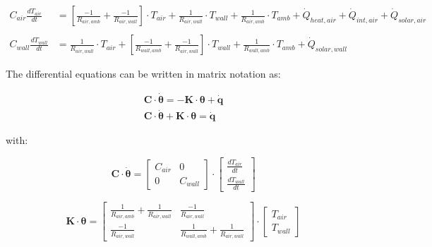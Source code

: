 \begin{equation}
	\begin{aligned}
		C_{air}\frac{dT_{air}}{dt} &= \left[ \frac{-1}{R_{air, amb}} + \frac{-1}{R_{air, wall}} \right]  \cdot T_{air}  + \frac{1}{R_{air, wall}} \cdot T_{wall} + \frac{1}{R_{air, amb}} \cdot T_{amb} + \dot{Q}_{heat, air} + \dot{Q}_{int, air} + \dot{Q}_{solar, air} 
		\\ \\
		C_{wall}\frac{dT_{wall}}{dt} &= \frac{1}{R_{air, wall}} \cdot T_{air} + \left[ \frac{-1}{R_{wall, amb}} + \frac{-1}{R_{air, wall}} \right]  \cdot T_{wall} + \frac{1}{R_{wall, amb}} \cdot T_{amb} + \dot{Q}_{solar, wall}
	\end{aligned}
\end{equation}

The differential equations can be written in matrix notation as:

\begin{subequations}
	\label{eq:matnot}
	\begin{align}
		\mathbf{C} \cdot \boldsymbol{\dot{\theta}} = - \mathbf{K} \cdot \boldsymbol{\theta} + \mathbf{\dot{q}} \\ 
		\mathbf{C} \cdot \boldsymbol{\dot{\theta}} + \mathbf{K} \cdot \boldsymbol{\theta} = \mathbf{\dot{q}}
	\end{align}
\end{subequations}

with:

\begin{equation}
	\mathbf{C} \cdot \boldsymbol{\dot{\theta}} =
	\begin{bmatrix}
		C_{air} & 0 \\
		0 &  C_{wall}
	\end{bmatrix}
	\cdot
	\begin{bmatrix}
		\frac{dT_{air}}{dt} \\
		\frac{dT_{wall}}{dt}
	\end{bmatrix}
\end{equation}

\begin{equation}
	\mathbf{K} \cdot \boldsymbol{\theta} =
	\begin{bmatrix}
		\frac{1}{R_{air, amb}} + \frac{1}{R_{air, wall}} & \frac{-1}{R_{air, wall}} \\
		\frac{-1}{R_{air, wall}} &  \frac{1}{R_{wall, amb}} + \frac{1}{R_{air, wall}}
	\end{bmatrix}
	\cdot
	\begin{bmatrix}
		T_{air} \\
		T_{wall}
	\end{bmatrix}
\end{equation}

